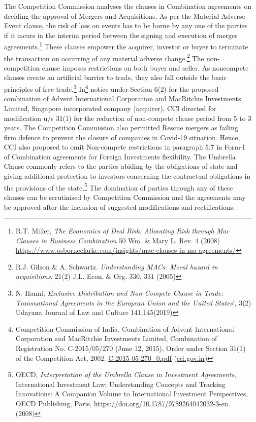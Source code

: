 \begin{multicols}{2}
\noi
The Competition Commission analyses the clauses in Combination agreements on deciding
the approval of Mergers and Acquisitions. As per the Material Adverse Event clause, the risk
of loss on events has to be borne by any one of the parties if it incurs in the interim period
between the signing and execution of merger agreements.\footnote{R.T. Miller, \textit{The Economics of Deal Risk: Allocating Risk through Mac Clauses in Business Combination}
50 Wm. \& Mary L. Rev. 4 (2008) \url{https://www.osborneclarke.com/insights/mac-clauses-in-ma-agreements/}} These clauses empower the
acquirer, investor or buyer to terminate the transaction on occurring of any material adverse
change.\footnote{R.J. Gilson \& A. Schwartz. \textit{Understanding MACs: Moral hazard in acquisitions}, 21(2) J.L. Econ. \& Org.
330, 331 (2005)} The non-competition clause imposes restrictions on both buyer and seller. As noncompete
clauses create an artificial barrier to trade, they also fall outside the basic principles
of free trade.\footnote{N. Hanni, \textit{Exclusive Distribution and Non-Compete Clause in Trade: Transnational Agreements in the
European Union and the United States}’, 3(2) Udayana Journal of Law and Culture 141,145(2019)} In\footnote{Competition Commission of India, Combination of Advent International Corporation and MacRitchie
Investments Limited, Combination of Registration No. C-2015/05/270 (June 12, 2015), Order under Section 31(1) of the Competition Act, 2002. \url{C-2015-05-270_0.pdf} (\url{cci.gov.in})} notice under Section 6(2) for the proposed combination of Advent
International Corporation and MacRitchie Investments Limited, Singapore incorporated
company (acquirer), CCI directed for modification u/s 31(1) for the reduction of non-compete
clause period from 5 to 3 years. The Competition Commission also permitted Rescue mergers
as failing firm defence to prevent the closure of companies in Covid-19 situation. Hence, CCI
also proposed to omit Non-compete restrictions in paragraph 5.7 in Form-I of Combination
agreements for Foreign Investments flexibility. The Umbrella Clause commonly refers to the
parties abiding by the obligations of state and giving additional protection to investors
concerning the contractual obligations in the provisions of the state.\footnote{OECD, \textit{Interpretation of the Umbrella Clause in Investment Agreements}, International Investment Law:
Understanding Concepts and Tracking Innovations: A Companion Volume to International Investment
Perspectives, OECD Publishing, Paris, \url{https://doi.org/10.1787/9789264042032-3-en}.(2008)} The domination of
parties through any of these clauses can be scrutinised by Competition Commission and the
agreements may be approved after the inclusion of suggested modifications and rectifications.
\smallskip


\end{multicols}
